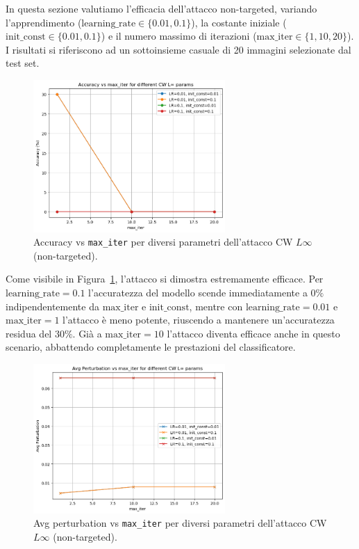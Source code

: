             \noindent In questa sezione valutiamo l'efficacia dell'attacco non-targeted, variando l'apprendimento ($\text{learning\_rate} \in \{0.01, 0.1\}$), la costante iniziale ($\text{init\_const} \in \{0.01, 0.1\}$) e il numero massimo di iterazioni ($\text{max\_iter} \in \{1, 10, 20\}$). I risultati si riferiscono ad un sottoinsieme casuale di 20 immagini selezionate dal test set.
            
            \begin{figure}[H]
                \centering
                \includegraphics[width=0.65\textwidth]{images/cw_non_targeted_accuracy.png}
                \caption{Accuracy vs \texttt{max\_iter} per diversi parametri dell'attacco CW $L\infty$ (non-targeted).}
                \label{fig:cw-nt-accuracy}
            \end{figure}
            
            \noindent Come visibile in Figura~\ref{fig:cw-nt-accuracy}, l'attacco si dimostra estremamente efficace. Per $\text{learning\_rate} = 0.1$ l’accuratezza del modello scende immediatamente a $0\%$ indipendentemente da $\text{max\_iter}$ e $\text{init\_const}$, mentre con $\text{learning\_rate} = 0.01$ e $\text{max\_iter} = 1$ l’attacco è meno potente, riuscendo a mantenere un’accuratezza residua del $30\%$. Già a $\text{max\_iter} = 10$ l’attacco diventa efficace anche in questo scenario, abbattendo completamente le prestazioni del classificatore.
            
            \begin{figure}[H]
                \centering
                \includegraphics[width=0.65\textwidth]{images/cw_non_targeted_perturbation.png}
                \caption{Avg perturbation vs \texttt{max\_iter} per diversi parametri dell'attacco CW $L\infty$ (non-targeted).}
                \label{fig:cw-nt-perturbation}
            \end{figure}
            
